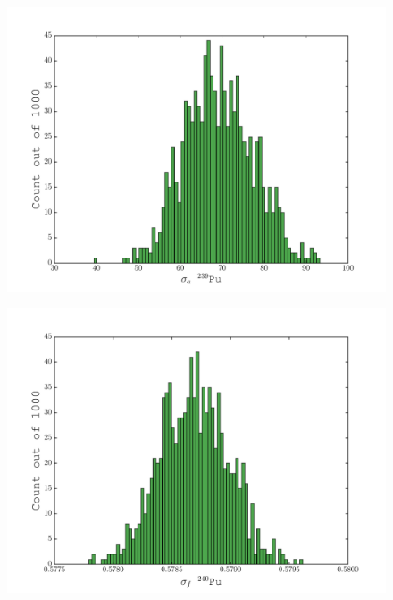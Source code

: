 \documentclass{beamer}
\begin{document}
\begin{frame}
  \begin{figure}[H]
    \begin{center}
      \hspace*{-0.6cm}\includegraphics[width=1\columnwidth]{../Origen2/PLOTS/94Pu239aHIST.pdf}
      \vspace{-5mm}
      \label{fig:SPu239a}
    \end{center}
  \end{figure}
\end{frame}


\begin{frame}
  \begin{figure}[H]
    \begin{center}
      \hspace*{-0.6cm}\includegraphics[width=1\columnwidth]{../Origen2/PLOTS/94Pu240fHIST.pdf}
      \vspace{-5mm}
      \label{fig:SPu240f}
    \end{center}
  \end{figure}
\end{frame}
\end{document}
